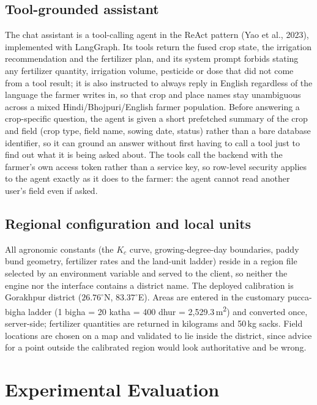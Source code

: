 \documentclass[11pt,a4paper]{article}
\begin{document}
\subsection{Tool-grounded assistant}

The chat assistant is a tool-calling agent in the ReAct pattern (Yao et al., 2023), implemented with LangGraph. Its tools return the fused crop state, the irrigation recommendation and the fertilizer plan, and its system prompt forbids stating any fertilizer quantity, irrigation volume, pesticide or dose that did not come from a tool result; it is also instructed to always reply in English regardless of the language the farmer writes in, so that crop and place names stay unambiguous across a mixed Hindi/Bhojpuri/English farmer population. Before answering a crop-specific question, the agent is given a short prefetched summary of the crop and field (crop type, field name, sowing date, status) rather than a bare database identifier, so it can ground an answer without first having to call a tool just to find out what it is being asked about. The tools call the backend with the farmer's own access token rather than a service key, so row-level security applies to the agent exactly as it does to the farmer: the agent cannot read another user's field even if asked.

\subsection{Regional configuration and local units}

All agronomic constants (the $K_c$ curve, growing-degree-day boundaries, paddy bund geometry, fertilizer rates and the land-unit ladder) reside in a region file selected by an environment variable and served to the client, so neither the engine nor the interface contains a district name. The deployed calibration is Gorakhpur district ($26.76^{\circ}$N, $83.37^{\circ}$E). Areas are entered in the customary pucca-bigha ladder (1 bigha = 20 katha = 400 dhur = 2{,}529.3\,m\textsuperscript{2}) and converted once, server-side; fertilizer quantities are returned in kilograms and 50\,kg sacks. Field locations are chosen on a map and validated to lie inside the district, since advice for a point outside the calibrated region would look authoritative and be wrong.

\section{Experimental Evaluation}
\end{document}
